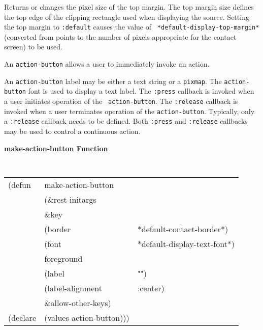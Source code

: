 \begin{flushright} \parbox[t]{6.125in}{
Returns or changes the pixel size of the
top margin.  The top margin size defines
the top edge of the clipping rectangle used when displaying the source.
Setting the top margin to {\tt :default} causes the value of {\tt
*default-display-top-margin*} (converted from points to the number of pixels
appropriate for the contact screen) to be used.
}
\end{flushright}


                                 





An {\tt action-button} allows a user to immediately invoke an action.


An {\tt action-button} label may be either a text string or a {\tt pixmap}. The
{\tt action-button} font is used to display a text label.
The {\tt :press} callback is invoked when a user initiates operation of the {\tt
action-button}.  The {\tt :release} callback is invoked when a user terminates
operation of the {\tt action-button}.  Typically, only a {\tt :release} callback
needs to be defined.  Both {\tt :press} and {\tt :release} callbacks may be used
to control a continuous action.


{\samepage
{\large {\bf make-action-button \hfill Function}} 
\begin{flushright} \parbox[t]{6.125in}{
\tt
\begin{tabular}{lll}
\raggedright
(defun & make-action-button \\
       & (\&rest initargs \\
       & \&key  \\
       & (border                & *default-contact-border*) \\ 
       & (font                  & *default-display-text-font*) \\ 
       & foreground \\
       & (label                 & "") \\  
       & (label-alignment       & :center) \\  
       &   \&allow-other-keys) \\
(declare & (values   action-button)))
\end{tabular}
\rm

}\end{flushright}}

